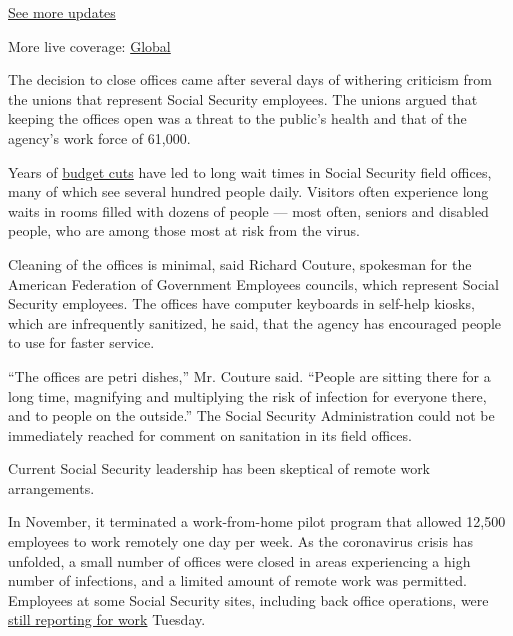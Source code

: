 \href{https://www.nytimes3xbfgragh.onion/live/2020/08/20/business/stock-market-today-coronavirus?action=click\&pgtype=Article\&state=default\&region=MAIN_CONTENT_1\&context=storylines_live_updates}{See
more updates}

More live coverage:
\href{https://www.nytimes3xbfgragh.onion/2020/08/21/world/covid-19-coronavirus.html?action=click\&pgtype=Article\&state=default\&region=MAIN_CONTENT_1\&context=storylines_live_updates}{Global}

The decision to close offices came after several days of withering
criticism from the unions that represent Social Security employees. The
unions argued that keeping the offices open was a threat to the public's
health and that of the agency's work force of 61,000.

Years of
\href{https://www.nytimes3xbfgragh.onion/2018/11/21/business/social-security-service-backlog-delays.html}{budget
cuts} have led to long wait times in Social Security field offices, many
of which see several hundred people daily. Visitors often experience
long waits in rooms filled with dozens of people --- most often, seniors
and disabled people, who are among those most at risk from the virus.

Cleaning of the offices is minimal, said Richard Couture, spokesman for
the American Federation of Government Employees councils, which
represent Social Security employees. The offices have computer keyboards
in self-help kiosks, which are infrequently sanitized, he said, that the
agency has encouraged people to use for faster service.

``The offices are petri dishes,'' Mr. Couture said. ``People are sitting
there for a long time, magnifying and multiplying the risk of infection
for everyone there, and to people on the outside.'' The Social Security
Administration could not be immediately reached for comment on
sanitation in its field offices.

Current Social Security leadership has been skeptical of remote work
arrangements.

In November, it terminated a work-from-home pilot program that allowed
12,500 employees to work remotely one day per week. As the coronavirus
crisis has unfolded, a small number of offices were closed in areas
experiencing a high number of infections, and a limited amount of remote
work was permitted. Employees at some Social Security sites, including
back office operations, were
\href{https://www.nytimes3xbfgragh.onion/2020/03/16/us/politics/coronavirus-government-work.html}{still
reporting for work} Tuesday.


